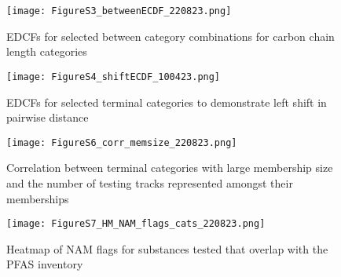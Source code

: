 \documentclass[
  super,
  preprint,
  3p]{elsarticle}
\begin{document}
\newpage{}

\begin{figure}

{\centering \texttt{[image: FigureS3\_betweenECDF\_220823.png]}

}

\caption{\label{fig-ecdfs-bet}EDCFs for selected between category
combinations for carbon chain length categories}

\end{figure}

\begin{figure}

{\centering \texttt{[image: FigureS4\_shiftECDF\_100423.png]}

}

\caption{\label{fig-ecdfs-left}EDCFs for selected terminal categories to
demonstrate left shift in pairwise distance}

\end{figure}

\begin{figure}

{\centering \texttt{[image: FigureS6\_corr\_memsize\_220823.png]}

}

\caption{\label{fig-cat-mem}Correlation between terminal categories with
large membership size and the number of testing tracks represented
amongst their memberships}

\end{figure}

\begin{figure}

{\centering \texttt{[image: FigureS7\_HM\_NAM\_flags\_cats\_220823.png]}

}

\caption{\label{fig-nams-hm}Heatmap of NAM flags for substances tested
that overlap with the PFAS inventory}

\end{figure}
\end{document}
